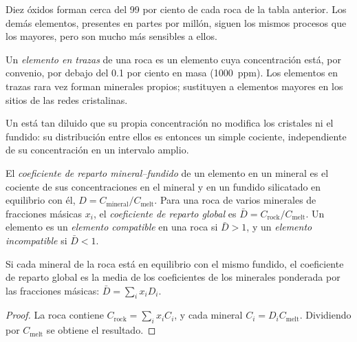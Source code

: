 Diez óxidos forman cerca del 99 por ciento de cada roca de la tabla anterior. Los demás elementos,
presentes en partes por millón, siguen los mismos procesos que los mayores, pero
son mucho más sensibles a ellos.

\begin{definition}\label{def:b2:elements-in-the-earth:trace}
Un \emph{elemento en trazas} de una roca es un elemento cuya
concentración está, por convenio, por debajo del 0.1 por ciento en masa (\qty{1000}{ppm}).
Los elementos en trazas rara vez forman minerales propios; sustituyen a elementos
mayores en los sitios de las redes cristalinas.
\end{definition}

Un  está tan diluido que su propia concentración no modifica los
cristales ni el fundido: su distribución entre ellos es entonces un simple cociente,
independiente de su concentración en un intervalo amplio.

\begin{definition}\label{def:b2:elements-in-the-earth:partition}
El \emph{coeficiente de reparto mineral--fundido}
de un elemento en un mineral es el cociente de sus concentraciones en el
mineral y en un fundido silicatado en equilibrio con él,
$D = C_{\mathrm{mineral}}/C_{\mathrm{melt}}$. Para una roca de varios minerales de
fracciones másicas $x_i$, el \emph{coeficiente de reparto global} es
$\bar D = C_{\mathrm{rock}}/C_{\mathrm{melt}}$. Un elemento es un
\emph{elemento compatible} en una roca si $\bar D > 1$,
y un \emph{elemento incompatible} si $\bar D < 1$.
\end{definition}

\begin{proposition}
\label{prop:b2:elements-in-the-earth:bulk-d}
Si cada mineral de la roca está en equilibrio con el mismo fundido, el coeficiente
de reparto global es la media de los coeficientes de los minerales ponderada por
las fracciones másicas: $\bar D = \sum_i x_i D_i$.
\end{proposition}

\begin{proof}
La roca contiene $C_{\mathrm{rock}} = \sum_i x_i C_i$, y cada mineral
$C_i = D_i C_{\mathrm{melt}}$. Dividiendo por $C_{\mathrm{melt}}$ se obtiene el resultado.
\end{proof}


